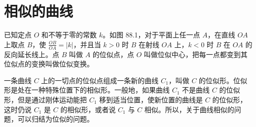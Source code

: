 \section{相似的曲线}

已知定点 $O$ 和不等于零的常数 $k$。如图 88.1，对于平面上任一点 $A$，在直线 $OA$ 上取点 $B$，使 $\frac{OB}{OA} = |k|$，并且当 $k > 0$ 时 $B$ 在射线 $OA$ 上，$k < 0$ 时 $B$ 在 $OA$ 的反向延长线上。点 $B$ 叫做 $A$ 的位似点，点 $O$ 叫做位似中心，把每一点都变到其位似点的变换叫做位似变换。

一条曲线 $C$ 上的一切点的位似点组成一条新的曲线 $C_1$，叫做 $C$ 的位似形。位似形是处在一种特殊位置下的相似形。一般地，如果曲线 $C_1$ 不是曲线 $C$ 的位似形，但是通过刚体运动能把 $C_1$ 移到适当位置，使新位置的曲线是 $C$ 的位似形，这时仍说 $C_1$ 是 $C$ 的相似形，或者说 $C_1$ 与 $C$ 相似。所以，关于曲线相似的问题，可以归结为位似的问题。

